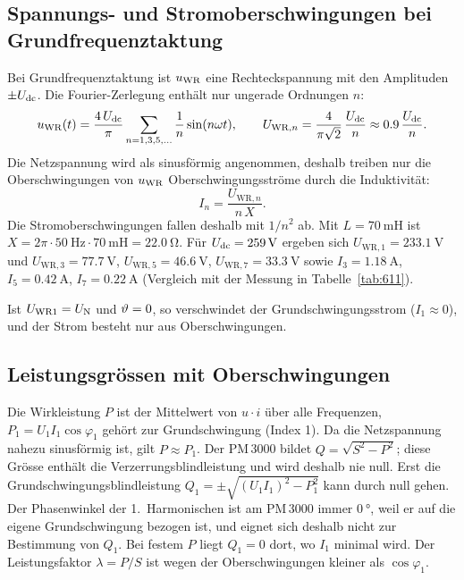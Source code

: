 \subsection{Spannungs- und Stromoberschwingungen bei Grundfrequenztaktung}

Bei Grundfrequenztaktung ist $u_{\mathrm{WR}}$ eine Rechteckspannung mit den Amplituden $\pm U_{\mathrm{dc}}$. Die Fourier-Zerlegung enthält nur ungerade Ordnungen $n$:
\begin{equation}
  u_{\mathrm{WR}}(t)=\frac{4\,U_{\mathrm{dc}}}{\pi}\sum_{n=1,3,5,\dots}\frac{1}{n}\sin(n\omega t),
  \qquad
  U_{\mathrm{WR},n}=\frac{4}{\pi\sqrt2}\,\frac{U_{\mathrm{dc}}}{n}\approx 0.9\,\frac{U_{\mathrm{dc}}}{n}.
  \label{eq:rechteck}
\end{equation}
Die Netzspannung wird als sinusförmig angenommen, deshalb treiben nur die Oberschwingungen von $u_{\mathrm{WR}}$ Oberschwingungsströme durch die Induktivität:
\begin{equation}
  I_n=\frac{U_{\mathrm{WR},n}}{n\,X}.
  \label{eq:In}
\end{equation}
Die Stromoberschwingungen fallen deshalb mit $1/n^2$ ab. Mit $L=\SI{70}{\milli\henry}$ ist $X=2\pi\cdot\SI{50}{\hertz}\cdot\SI{70}{\milli\henry}=\SI{22.0}{\ohm}$. Für $U_{\mathrm{dc}}=\SI{259}{\volt}$ ergeben sich $U_{\mathrm{WR},1}=\SI{233.1}{\volt}$ und $U_{\mathrm{WR},3}=\SI{77.7}{\volt}$, $U_{\mathrm{WR},5}=\SI{46.6}{\volt}$, $U_{\mathrm{WR},7}=\SI{33.3}{\volt}$ sowie $I_3=\SI{1.18}{\ampere}$, $I_5=\SI{0.42}{\ampere}$, $I_7=\SI{0.22}{\ampere}$ (Vergleich mit der Messung in Tabelle~\ref{tab:611}).

Ist $U_{\mathrm{WR1}}=U_{\mathrm{N}}$ und $\vartheta=0$, so verschwindet der Grundschwingungsstrom ($I_1\approx0$), und der Strom besteht nur aus Oberschwingungen.

\subsection{Leistungsgrössen mit Oberschwingungen}

Die Wirkleistung $P$ ist der Mittelwert von $u\cdot i$ über alle Frequenzen, $P_1=U_1 I_1\cos\varphi_1$ gehört zur Grundschwingung (Index 1). Da die Netzspannung nahezu sinusförmig ist, gilt $P\approx P_1$. Der PM\,3000 bildet $Q=\sqrt{S^2-P^2}$; diese Grösse enthält die Verzerrungsblindleistung und wird deshalb nie null. Erst die Grundschwingungsblindleistung $Q_1=\pm\sqrt{(U_1I_1)^2-P_1^2}$ kann durch null gehen. Der Phasenwinkel der 1.\ Harmonischen ist am PM\,3000 immer $\SI{0}{\degree}$, weil er auf die eigene Grundschwingung bezogen ist, und eignet sich deshalb nicht zur Bestimmung von $Q_1$. Bei festem $P$ liegt $Q_1=0$ dort, wo $I_1$ minimal wird. Der Leistungsfaktor $\lambda=P/S$ ist wegen der Oberschwingungen kleiner als $\cos\varphi_1$.

